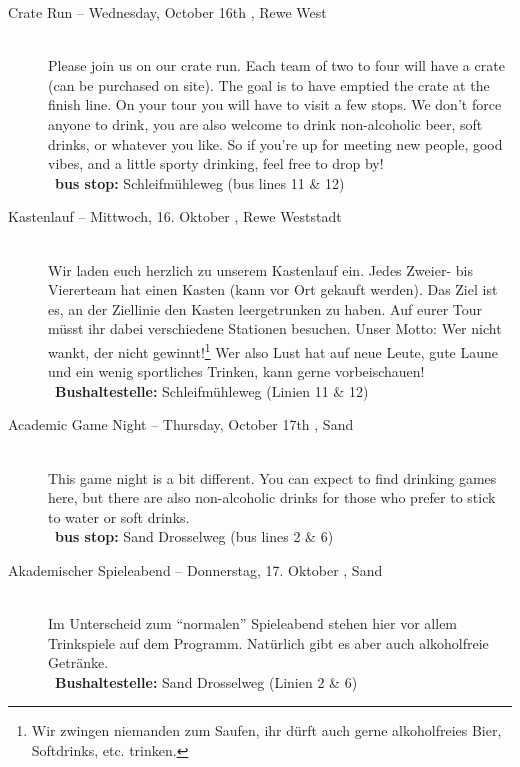 \begin{description}
\ifml
\item[Crate Run -- Wednesday, October 16th \YEAR, Rewe West]~\\
    Please join us on our crate run.
    Each team of two to four will have a crate (can be purchased on site).
    The goal is to have emptied the crate at the finish line.
    On your tour you will have to visit a few stops.
    We don't force anyone to drink, you are also welcome to drink non-alcoholic beer, soft drinks, or whatever you like.
    So if you're up for meeting new people, good vibes, and a little sporty drinking, feel free to drop by! \\
    ~\textbf{bus stop:} Schleifmühleweg (bus lines 11 \& 12)
\else
\item[Kastenlauf -- Mittwoch, 16. Oktober \YEAR, Rewe Weststadt]~\\
    Wir laden euch herzlich zu unserem Kastenlauf ein.
    Jedes Zweier- bis Viererteam hat einen Kasten (kann vor Ort gekauft werden).
    Das Ziel ist es, an der Ziellinie den Kasten leergetrunken zu haben.
    Auf eurer Tour müsst ihr dabei verschiedene Stationen besuchen.
    Unser Motto: Wer nicht wankt, der nicht gewinnt!\footnote{Wir zwingen niemanden zum Saufen, ihr dürft auch gerne alkoholfreies Bier, Softdrinks, etc. trinken.}
    Wer also Lust hat auf neue Leute, gute Laune und ein wenig sportliches Trinken, kann gerne vorbeischauen! \\
    ~\textbf{Bushaltestelle:} Schleifmühleweg (Linien 11 \& 12)
\fi

\ifml
    \item[Academic Game Night -- Thursday, October 17th \YEAR, Sand]~\\%
    This game night is a bit different. You can expect to find drinking games here,
    but there are also non-alcoholic drinks for those who prefer to stick to water or soft drinks.\\
    ~\textbf{bus stop:} Sand Drosselweg (bus lines 2 \& 6)
\else
    \item[Akademischer Spieleabend -- Donnerstag, 17. Oktober \YEAR, Sand]~\\%
    Im Unterscheid zum "`normalen"' Spieleabend stehen hier vor allem Trinkspiele auf dem Programm.
    Natürlich gibt es aber auch alkoholfreie Getränke.\\
    ~\textbf{Bushaltestelle:} Sand Drosselweg (Linien 2 \& 6)
\fi


\end{description}
